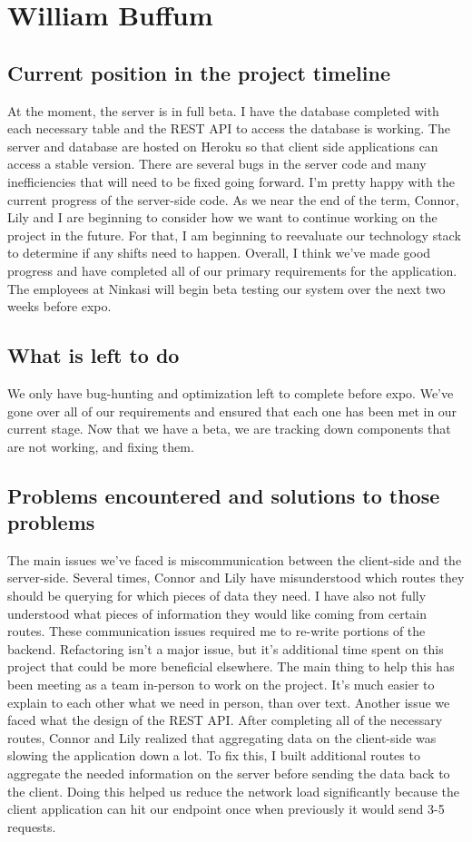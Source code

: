 \documentclass[draftclsnofoot,onecolumn,letterpaper,10pt,compsoc]{IEEEtran}
\begin{document}
\section{William Buffum}
\subsection{Current position in the project timeline}
At the moment, the server is in full beta.
I have the database completed with each necessary table and the REST API to access the database is working.
The server and database are hosted on Heroku so that client side applications can access a stable version.
There are several bugs in the server code and many inefficiencies that will need to be fixed going forward.
I'm pretty happy with the current progress of the server-side code.
As we near the end of the term, Connor, Lily and I are beginning to consider how we want to continue working on the project in the future.
For that, I am beginning to reevaluate our technology stack to determine if any shifts need to happen.
Overall, I think we've made good progress and have completed all of our primary requirements for the application.
The employees at Ninkasi will begin beta testing our system over the next two weeks before expo.

\subsection{What is left to do}
We only have bug-hunting and optimization left to complete before expo.
We've gone over all of our requirements and ensured that each one has been met in our current stage.
Now that we have a beta, we are tracking down components that are not working, and fixing them.

\subsection{Problems encountered and solutions to those problems}
The main issues we've faced is miscommunication between the client-side and the server-side.
Several times, Connor and Lily have misunderstood which routes they should be querying for which pieces of data they need.
I have also not fully understood what pieces of information they would like coming from certain routes.
These communication issues required me to re-write portions of the backend.
Refactoring isn't a major issue, but it's additional time spent on this project that could be more beneficial elsewhere.
The main thing to help this has been meeting as a team in-person to work on the project.
It's much easier to explain to each other what we need in person, than over text.
Another issue we faced what the design of the REST API.
After completing all of the necessary routes, Connor and Lily realized that aggregating data on the client-side was slowing the application down a lot.
To fix this, I built additional routes to aggregate the needed information on the server before sending the data back to the client.
Doing this helped us reduce the network load significantly because the client application can hit our endpoint once when previously it would send 3-5 requests.
\end{document}
